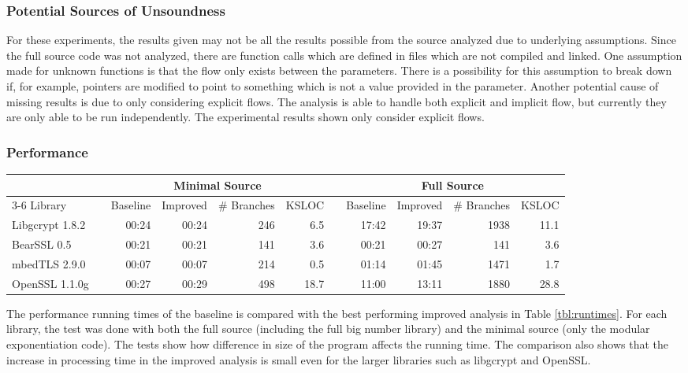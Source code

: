 \subsubsection{Potential Sources of Unsoundness}
For these experiments, the results given may not be all the results possible
from the source analyzed due to underlying assumptions. Since the full source
code was not analyzed, there are function calls which are defined in files which
are not compiled and linked. One assumption made for unknown functions is that
the flow only exists between the parameters. There is a possibility for this
assumption to break down if, for example, pointers are modified to point to
something which is not a value provided in the parameter. Another potential
cause of missing results is due to only considering explicit flows. The analysis
is able to handle both explicit and implicit flow, but currently they are only
able to be run independently. The experimental results shown only consider
explicit flows.

\subsubsection{Performance}

\begin{table*}[!t]
  \centering
  \begin{tabular}{@{}lcrrrrcrrrr@{}}
    \toprule
     & & \multicolumn{4}{c}{Minimal Source} & &  \multicolumn{4}{c}{Full Source} \\
    \cmidrule{3-6} \cmidrule{8-11}
    Library&& Baseline & Improved & \# Branches & KSLOC && Baseline & Improved & \# Branches & KSLOC\\
    \midrule
    Libgcrypt 1.8.2 && 00:24 & 00:24 & 246 & 6.5 &&  17:42 & 19:37 & 1938 & 11.1\\
    BearSSL 0.5 && 00:21 & 00:21 & 141  & 3.6 && 00:21 & 00:27  & 141 & 3.6\\
    mbedTLS 2.9.0 && 00:07 & 00:07& 214 & 0.5 && 01:14 & 01:45  & 1471 & 1.7\\
    OpenSSL 1.1.0g && 00:27 & 00:29& 498 & 18.7 && 11:00 & 13:11 & 1880 & 28.8\\
    \bottomrule
  \end{tabular}
\caption{Baseline and Improved Analysis Run Time (mm:ss)}
\label{tbl:runtimes}
\end{table*}



The performance running times of the baseline is compared with the best
performing improved analysis in Table \ref{tbl:runtimes}. For each library, the
test was done with both the full source (including the full big number library)
and the minimal source (only the modular exponentiation code). The
tests show how difference in size of the program affects the running time. The comparison
also shows that the increase in processing time in the improved analysis is
small even for the larger libraries such as libgcrypt and OpenSSL.

